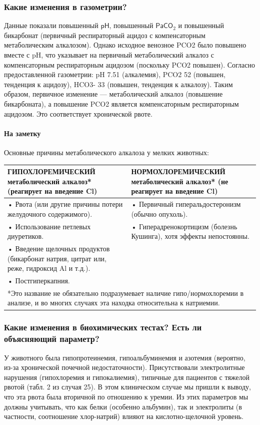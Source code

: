 \documentclass[a4paper,12pt]{book}
\begin{document}
\subsubsection*{Какие изменения в газометрии?}
Данные показали повышенный $\mathsf{pH}$, повышенный $\mathsf{PaCO}_{2}$ и повышенный бикарбонат (первичный респираторный ацидоз с компенсаторным метаболическим алкалозом). Однако исходное венозное PCO2 было повышено вместе с pH, что указывает на первичный метаболический алкалоз с компенсаторным респираторным ацидозом (поскольку PCO2 повышен). Согласно предоставленной газометрии: pH 7.51 (алкалемия), PCO2 52 (повышен, тенденция к ацидозу), HCO3- 33 (повышен, тенденция к алкалозу). Таким образом, первичное изменение — метаболический алкалоз (повышение бикарбоната), а повышение PCO2 является компенсаторным респираторным ацидозом. Это соответствует хронической рвоте.

\paragraph{На заметку}
Основные причины метаболического алкалоза у мелких животных:

\begin{tabular}{p{7cm}p{7cm}}
\toprule
ГИПОХЛОРЕМИЧЕСКИЙ метаболический алкалоз* (реагирует на введение Cl) & НОРМОХЛОРЕМИЧЕСКИЙ метаболический алкалоз* (не реагирует на введение Cl) \\
\midrule
• Рвота (или другие причины потери желудочного содержимого). & • Первичный гиперальдостеронизм (обычно опухоль). \\
• Использование петлевых диуретиков. & • Гиперадренокортицизм (болезнь Кушинга), хотя эффекты непостоянны. \\
• Введение щелочных продуктов (бикарбонат натрия, цитрат или, реже, гидроксид Al и т.д.). & \\
• Постгиперкапния. & \\
\bottomrule
\multicolumn{2}{l}{*Это название не обязательно подразумевает наличие гипо/нормохлоремии в анализе, и во многих случаях эта находка относительна к натриемии.}
\end{tabular}

\subsubsection*{Какие изменения в биохимических тестах? Есть ли объясняющий параметр?}
У животного была гипопротеинемия, гипоальбуминемия и азотемия (вероятно, из-за хронической почечной недостаточности). Присутствовали электролитные нарушения (гипохлоремия и гипокалиемия), типичные для пациентов с тяжелой рвотой (табл. 2 из случая 25). В этом клиническом случае мы пришли к выводу, что эта рвота была вторичной по отношению к уремии. Из этих параметров мы должны учитывать, что как белки (особенно альбумин), так и электролиты (в частности, соотношение хлор-натрий) влияют на кислотно-щелочной уровень.
\end{document}
